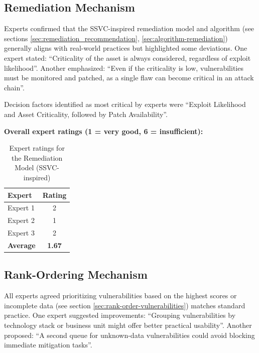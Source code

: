 \subsection{Remediation Mechanism}

Experts confirmed that the \ac{SSVC}-inspired remediation model and algorithm (see sections \ref{sec:remediation_recommendation}, \ref{sec:algorithm-remediation}) generally aligns with real-world practices but highlighted some deviations. One expert stated: \enquote{Criticality of the asset is always considered, regardless of exploit likelihood}. Another emphasized: \enquote{Even if the criticality is low, vulnerabilities must be monitored and patched, as a single flaw can become critical in an attack chain}.

Decision factors identified as most critical by experts were \enquote{Exploit Likelihood and Asset Criticality, followed by Patch Availability}.

\textbf{Overall expert ratings (1 = very good, 6 = insufficient):}
\\
\begin{table}[H]
\centering
\begin{tabular}{|l|c|}
    \hline
    Expert & Rating \\
    \hline
    Expert 1 & 2 \\
    Expert 2 & 1 \\
    Expert 3 & 2 \\
    \hline
    \textbf{Average} & \textbf{1.67} \\
    \hline
\end{tabular}
\caption{Expert ratings for the Remediation Model (\ac{SSVC}-inspired)}
\label{tab:expert_ratings_remediation_ssvc}
\end{table}

\subsection{Rank-Ordering Mechanism}

All experts agreed prioritizing vulnerabilities based on the highest scores or incomplete data (see section \ref{sec:rank-order-vulnerabilities}) matches standard practice. One expert suggested improvements: \enquote{Grouping vulnerabilities by technology stack or business unit might offer better practical usability}. Another proposed: \enquote{A second queue for unknown-data vulnerabilities could avoid blocking immediate mitigation tasks}.

